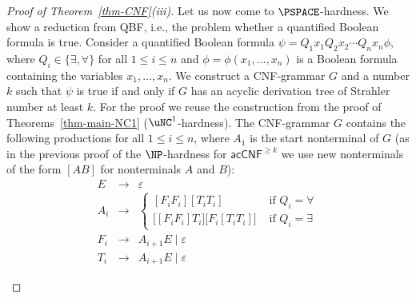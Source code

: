 \documentclass[a4paper,UKenglish,cleveref, autoref, thm-restate, numberwithinsect]{lipics-v2021}
\newcommand{\acCNF}{\mathsf{acCNF}}
\newcommand{\CNFack}{\acCNF^{\ge k}}
\begin{document}
\begin{proof}[Proof of Theorem~\ref{thm-CNF}(iii)]
Let us now come to $\PSPACE$-hardness. We show a reduction from \textsf{QBF}, i.e., the problem whether a quantified Boolean formula
is true. Consider a quantified Boolean formula $\psi = Q_1 x_1 Q_2 x_2 \cdots Q_n x_n \phi$, where
$Q_i \in \{ \exists, \forall \}$ for all $1 \le i \le n$ and  $\phi = \phi(x_1, \ldots, x_n)$ is a Boolean formula containing the variables
$x_1, \ldots, x_n$.
We construct a CNF-grammar $G$ and a number $k$ such that $\psi$ is true if and only if $G$ has an acyclic derivation tree of Strahler number
at least $k$. For the proof we reuse the construction from the proof of Theorems~\ref{thm-main-NC1} 
($\uNC^1$-hardness).
The CNF-grammar $G$ contains the following productions for all $1 \le i \leq n$, where $A_1$ is the start nonterminal of $G$
(as in the previous proof of the $\NP$-hardness for $\CNFack$ 
we use new nonterminals of the form $[AB]$ for nonterminals $A$ and $B$):
\begin{eqnarray}
E & \to & \varepsilon \nonumber \\
A_i & \to & 
\begin{cases}
[F_i F_i ] [T_i T_i]                                                           
& \text{ if } Q_i = \forall \\[2mm]
\big[[F_i F_i] T_i \big] \big[ F_i [T_i T_i]  \big] 
& \text{ if } Q_i = \exists
\end{cases} \label{rule-A_i} \\
F_i & \to & A_{i+1} E \mid \varepsilon \nonumber \\
T_i & \to & A_{i+1} E \mid \varepsilon \nonumber
\end{eqnarray}
\begin{figure}[t]
\end{figure}
\end{proof}
\end{document}
